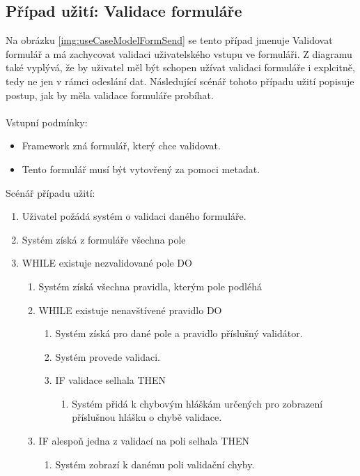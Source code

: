 \subsection{Případ užití: Validace formuláře}
Na obrázku \ref{img:useCaseModelFormSend} se tento případ jmenuje Validovat formulář a má zachycovat validaci uživatelského vstupu ve formuláři. Z diagramu také vyplývá, že by uživatel měl být schopen užívat validaci formuláře i explcitně, tedy ne jen v rámci odeslání dat. Následující scénář tohoto případu užití popisuje postup, jak by měla validace formuláře probíhat.\\\\
Vstupní podmínky:
\begin{itemize}
\item Framework zná formulář, který chce validovat. 
\item Tento formulář musí být vytovřený za pomoci metadat.
\end{itemize}
Scénář případu užití:
\begin{enumerate}
\item Uživatel požádá systém o validaci daného formuláře.
\item Systém získá z formuláře všechna pole
\item WHILE existuje nezvalidované pole DO
\begin{enumerate}
\item Systém získá všechna pravidla, kterým pole podléhá
\item WHILE existuje nenavštívené pravidlo DO
\begin{enumerate}
\item Systém získá pro dané pole a pravidlo příslušný validátor.
\item Systém provede validaci.
\item IF validace selhala THEN
\begin{enumerate}
\item Systém přidá k chybovým hláškám určených pro zobrazení příslušnou hlášku o chybě validace.
\end{enumerate}
\end{enumerate}
\item IF alespoň jedna z validací na poli selhala THEN
\begin{enumerate}
\item Systém zobrazí k danému poli validační chyby.
\end{enumerate}
\end{enumerate} 
\end{enumerate}

